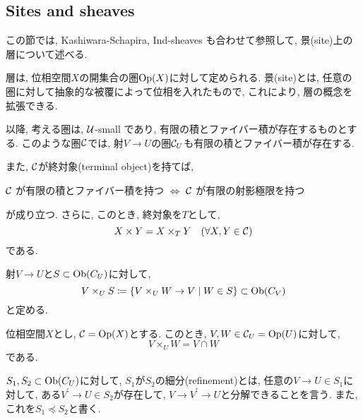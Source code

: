 \documentclass[../main]{subfiles}
\begin{document}
\setcounter{section}{2}
\setcounter{subsection}{1} \addtocounter{subsection}{-1}
\subsection{Sites and sheaves}
この節では,
Kashiwara-Schapira, Ind-sheaves \cite{book:KS_ind}
も合わせて参照して,
景(site)上の層について述べる.

\vspace{0.5em}
層は, 位相空間$X$の開集合の圏$\mathrm{Op}(X)$に対して定められる.
景(site)とは, 任意の圏に対して抽象的な被覆によって位相を入れたもので,
これにより, 層の概念を拡張できる.

以降, 考える圏は, $\mathcal{U}$-small であり,
有限の積とファイバー積が存在するものとする.
このような圏$\mathcal{C}$では,
射$V\to U$の圏$\mathcal{C}_U$も有限の積とファイバー積が存在する.

また, $\mathcal{C}$が終対象(terminal object)を持てば,
\begin{center}
  $\mathcal{C}$ が有限の積とファイバー積を持つ
  $\iff$
  $\mathcal{C}$ が有限の射影極限を持つ
\end{center}
が成り立つ.
さらに, このとき, 終対象を$T$として,
\[
  X\times Y = X\times_T Y \hspace{1em} (\forall X, Y\in \mathcal{C})
\]
である.

\begin{sym*}
  射$V\to U$と$S\subset \mathrm{Ob}(C_U)$に対して,
  \[
    V\times_U S
    \coloneqq
    \left\{
      V \times_U W \to V
      \mathrel{}\middle|\mathrel{}
      W\in S
      \right\} \subset \mathrm{Ob}(C_V)
  \]
  と定める.
\end{sym*}

\begin{rem*}
  位相空間$X$とし, $\mathcal{C} = \mathrm{Op}(X)$とする.
  このとき,
  $V,W\in\mathcal{C}_U = \mathrm{Op}(U)$に対して,
  \[
    V\times_U W = V\cap W
  \]
  である.
\end{rem*}

\begin{dfn}
  $S_1,S_2\subset \mathrm{Ob}(C_U)$に対して,
  $S_1$が$S_2$の細分(refinement)とは,
  任意の$V\to U \in S_1$に対して,
  ある$V^\prime\to U\in S_2$が存在して,
  $V\to V^\prime \to U$と分解できることを言う.
  また, これを$S_1 \preceq S_2$と書く.
\end{dfn}
\end{document}

